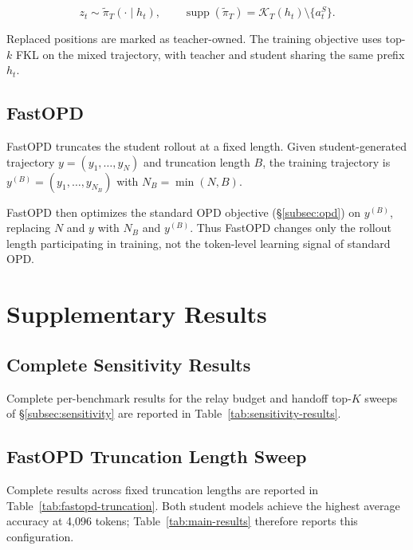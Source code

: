 \documentclass{article} %
\begin{document}
\begin{equation}
z_t
\sim
\widetilde\pi_T(\cdot\mid h_t),
\qquad
\operatorname{supp}(\widetilde\pi_T)=\mathcal K_T(h_t)\setminus\{a_t^S\}.
\end{equation}

Replaced positions are marked as teacher-owned. The training objective uses top-$k$ FKL on the mixed trajectory, with teacher and student sharing the same prefix $h_t$.\par

\subsection{FastOPD}\label{app:fastopd}

FastOPD \citep{ziheng2026less,zhang2026fast} truncates the student rollout at a fixed length. Given student-generated trajectory $y=(y_1,\ldots,y_N)$ and truncation length $B$, the training trajectory is $y^{(B)}=(y_1,\ldots,y_{N_B})$ with $N_B=\min(N,B)$.\par

FastOPD then optimizes the standard OPD objective (\S\ref{subsec:opd}) on $y^{(B)}$, replacing $N$ and $y$ with $N_B$ and $y^{(B)}$. Thus FastOPD changes only the rollout length participating in training, not the token-level learning signal of standard OPD.\par

\clearpage
\section{Supplementary Results}\label{app:supplementary}

\subsection{Complete Sensitivity Results}\label{app:sensitivity-full}

Complete per-benchmark results for the relay budget and handoff top-$K$ sweeps of \S\ref{subsec:sensitivity} are reported in Table~\ref{tab:sensitivity-results}.\par



\subsection{FastOPD Truncation Length Sweep}\label{app:fastopd-sweep}

Complete results across fixed truncation lengths are reported in Table~\ref{tab:fastopd-truncation}. Both student models achieve the highest average accuracy at 4,096 tokens; Table~\ref{tab:main-results} therefore reports this configuration.\par
\end{document}
